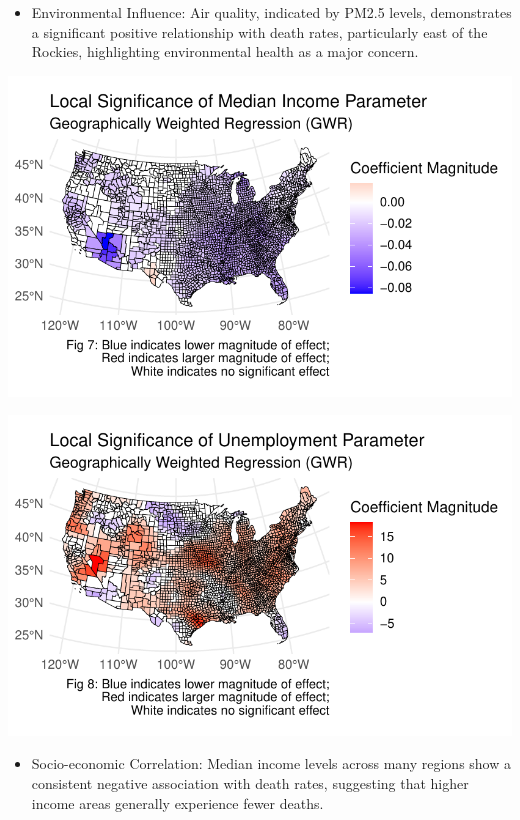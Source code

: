 \documentclass[
]{article}
\providecommand{\tightlist}{%
  \setlength{\itemsep}{0pt}\setlength{\parskip}{0pt}}\usepackage{longtable,booktabs,array}
\begin{document}
\begin{itemize}
\tightlist
\item
  Environmental Influence: Air quality, indicated by PM2.5 levels,
  demonstrates a significant positive relationship with death rates,
  particularly east of the Rockies, highlighting environmental health as
  a major concern.
\end{itemize}

\includegraphics{report_files/figure-pdf/unnamed-chunk-5-1.pdf}

\includegraphics{report_files/figure-pdf/unnamed-chunk-5-2.pdf}

\begin{itemize}
\tightlist
\item
  Socio-economic Correlation: Median income levels across many regions
  show a consistent negative association with death rates, suggesting
  that higher income areas generally experience fewer deaths.
\end{itemize}
\end{document}
